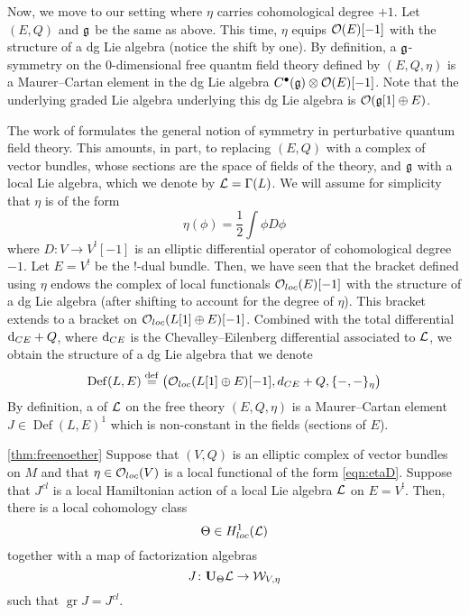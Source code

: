 \documentclass[11pt]{amsart}
\renewcommand{\op}{\operatorname}
\begin{document}
Now, we move to our setting where $\eta$ carries cohomological degree $+1$.
Let $(E,Q)$ and $\mathfrak{g}$ be the same as above. 
This time, $\eta$ equips $\mathcal O(E)[-1]$ with the
structure of a dg Lie algebra (notice the shift by one).
By definition, a $\mathfrak{g}$-symmetry on the $0$-dimensional free quantm field theory defined by $(E,Q,\eta)$ is a
Maurer--Cartan element in the dg Lie algebra $C^\bullet(\mathfrak{g}) \otimes \mathcal O(E)[-1]$.
Note that the underlying graded Lie algebra underlying this dg Lie algebra is $\mathcal O(\mathfrak{g}[1] \oplus E)$.

The work of \cite{fact2} formulates the general notion of symmetry in perturbative quantum field theory.
This amounts, in part, to replacing $(E,Q)$ with a complex of vector bundles, whose sections are the space of fields of the theory, and $\mathfrak{g}$ with a local Lie algebra,
which we denote by $\mathcal L = \Gamma (L)$.
We will assume for simplicity that $\eta$ is of the form
\begin{equation}\label{eqn:etaD}
\eta(\phi) = \frac12 \int \phi D \phi
\end{equation}
where $D \colon V \to V^![-1]$ is an elliptic differential operator of cohomological degree $-1$.
Let $E = V^!$ be the $!$-dual bundle.
Then, we have seen that the bracket defined using $\eta$ endows the complex of local functionals ${\mathcal O}_{loc}(E)[-1]$ with
the structure of a dg Lie algebra (after shifting to account for the degree of $\eta$).
This bracket extends to a bracket on ${\mathcal O}_{loc}(L[1] \oplus E)[-1]$. 
Combined with the total differential ${\rm d}_{CE} + Q$, where ${\rm d}_{CE}$ is the Chevalley--Eilenberg differential associated
to $\mathcal L$, we obtain the structure of a dg Lie algebra that we denote 
\begin{equation}\label{eq:def}
    \op{Def}(L,E) \define \big(\oloc(L[1] \oplus E)[-1] , d_{CE} + Q, \{-,-\}_\eta \big)
\end{equation}
By definition, a  of $\mathcal L$ on the free theory $(E,Q,\eta)$ is a Maurer--Cartan element
$J \in \op{Def}(L,E)^1$ which is non-constant in the fields (sections of $E$).

\begin{thm}\ref{thm:freenoether}
Suppose that $(V,Q)$ is an elliptic complex of vector bundles on $M$ and that $\eta \in {\mathcal O}_{loc}(V)$ is a local functional of the form \eqref{eqn:etaD}.
Suppose that $J^{cl}$ is a local Hamiltonian action of a local Lie algebra $\mathcal L$ on $E = V^!$.
Then, there is a local cohomology class
\begin{equation}
\Theta \in H^1_{loc}(\mathcal L)
\end{equation}
together with a map of factorization algebras
\begin{equation}
J \colon \mathbf{U}_{\Theta} \mathcal L \to \mathcal W_{V,\eta}
\end{equation}
such that $\op{gr} J = J^{cl}$.
\end{thm}
\end{document}
